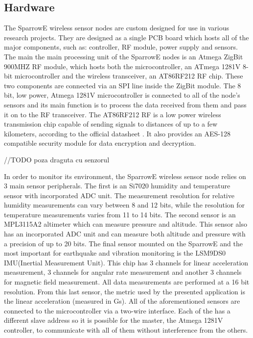 \label{chap:arch}
\subsection{Hardware}

The SparrowE wireless sensor nodes are custom designed for use in various research projects.
They are designed as a single PCB board which hosts all of the major components, such as: controller,
RF module, power supply and sensors. The main the main processing unit of the SparrowE nodes is an Atmega 
ZigBit 900MHZ RF module, which hosts both the microcontroller, an ATmega 1281V 8-bit microcontroller and the 
wireless transceiver, an AT86RF212 RF chip. These two components are connected via an SPI line inside the ZigBit 
module. The 8 bit, low power, Atmega 1281V microcontroller is connected to all of the node's sensors and its 
main function is to process the data received from them and pass it on to the RF transceiver. The AT86RF212 RF 
is a low power wireless transmission chip capable of sending signals to distances of up to a few kilometers, according 
to the official datasheet \cite{datasheetatmel}. It also provides an AES-128 compatible security module for data 
encryption and decryption.

//TODO poza draguta cu senzorul

In order to monitor its environment, the SparrowE wireless sensor node relies on 3 main sensor peripherals. The first is 
an Si7020 humidity and temperature sensor with incorporated ADC unit. The measurement resolution for relative humidity measurements
can vary between 8 and 12 bits, while the resolution for temperature measurements varies from 11 to 14 bits. The second sensor is 
an MPL3115A2 altimeter which can measure pressure and altitude. This sensor also has an incorporated ADC unit and can measure 
both altitude and pressure with a precision of up to 20 bits. The final sensor mounted on the SparrowE and the most important for 
earthquake and vibration monitoring is the LSM9DS0 IMU(Inertial Measurement Unit). This chip has 3 channels for linear acceleration measurement, 
3 channels for angular rate measurement and another 3 channels for magnetic field measurement. All data measurements are performed at a 
16 bit resolution. From this last sensor, the metric used by the presented application is the linear acceleration (measured in Gs).
All of the aforementioned sensors are connected to the microcontroller via a two-wire interface. Each of the has a different slave address so 
it is possible for the master, the Atmega 1281V controller, to communicate with all of them without interference from the others.

